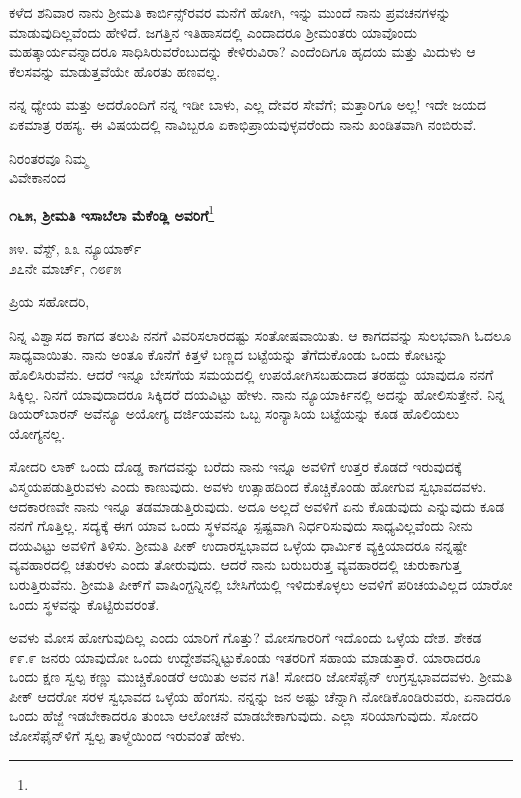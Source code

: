ಕಳೆದ ಶನಿವಾರ ನಾನು ಶ‍್ರೀಮತಿ ಕಾರ್ಬಿನ್ಸ್‌ರವರ ಮನೆಗೆ ಹೋಗಿ, ಇನ್ನು ಮುಂದೆ ನಾನು ಪ್ರವಚನಗಳನ್ನು ಮಾಡುವುದಿಲ್ಲವೆಂದು ಹೇಳಿದೆ. ಜಗತ್ತಿನ ಇತಿಹಾಸದಲ್ಲಿ ಎಂದಾದರೂ ಶ‍್ರೀಮಂತರು ಯಾವೊಂದು ಮಹತ್ಕಾರ್ಯವನ್ನಾದರೂ ಸಾಧಿಸಿರುವರೆಂಬುದನ್ನು ಕೇಳಿರುವಿರಾ? ಎಂದೆಂದಿಗೂ ಹೃದಯ ಮತ್ತು ಮಿದುಳು ಆ ಕೆಲಸವನ್ನು ಮಾಡುತ್ತವೆಯೇ ಹೊರತು ಹಣವಲ್ಲ.

ನನ್ನ ಧ್ಯೇಯ ಮತ್ತು ಅದರೊಂದಿಗೆ ನನ್ನ ಇಡೀ ಬಾಳು, ಎಲ್ಲ ದೇವರ ಸೇವೆಗೆ; ಮತ್ತಾರಿಗೂ ಅಲ್ಲ! ಇದೇ ಜಯದ ಏಕಮಾತ್ರ ರಹಸ್ಯ. ಈ ವಿಷಯದಲ್ಲಿ ನಾವಿಬ್ಬರೂ ಏಕಾಭಿಪ್ರಾಯವುಳ್ಳವರೆಂದು ನಾನು ಖಂಡಿತವಾಗಿ ನಂಬಿರುವೆ.

{\flushright
ನಿರಂತರವೂ ನಿಮ್ಮ\\ವಿವೇಕಾನಂದ\par}

\begin{center}
\textbf{೧೬೫, ಶ‍್ರೀಮತಿ ಇಸಾಬೆಲಾ ಮೆಕೆಂಡ್ಲಿ ಅವರಿಗೆ}\footnote{}
\end{center}

\begin{flushright}
೫೪. ವೆಸ್ಟ್, ೩೩ ನ್ಯೂಯಾರ್ಕ್\\೨೭ನೇ ಮಾರ್ಚ್, ೧೮೯೫
\end{flushright}

\noindent
ಪ್ರಿಯ ಸಹೋದರಿ,

ನಿನ್ನ ವಿಶ್ವಾಸದ ಕಾಗದ ತಲುಪಿ ನನಗೆ ವಿವರಿಸಲಾರದಷ್ಟು ಸಂತೋಷವಾಯಿತು. ಆ ಕಾಗದವನ್ನು ಸುಲಭವಾಗಿ ಓದಲೂ ಸಾಧ್ಯವಾಯಿತು. ನಾನು ಅಂತೂ ಕೊನೆಗೆ ಕಿತ್ತಳೆ ಬಣ್ಣದ ಬಟ್ಟೆಯನ್ನು ತೆಗೆದುಕೊಂಡು ಒಂದು ಕೋಟನ್ನು ಹೊಲಿಸಿರುವೆನು. ಆದರೆ ಇನ್ನೂ ಬೇಸಗೆಯ ಸಮಯದಲ್ಲಿ ಉಪಯೋಗಿಸಬಹುದಾದ ತರಹದ್ದು ಯಾವುದೂ ನನಗೆ ಸಿಕ್ಕಿಲ್ಲ. ನಿನಗೆ ಯಾವುದಾದರೂ ಸಿಕ್ಕಿದರೆ ದಯವಿಟ್ಟು ಹೇಳು. ನಾನು ನ್ಯೂಯಾರ್ಕಿನಲ್ಲಿ ಅದನ್ನು ಹೋಲಿಸುತ್ತೇನೆ. ನಿನ್ನ ಡಿಯರ್‌ಬಾರನ್ ಅವೆನ್ಯೂ ಅಯೋಗ್ಯ ದರ್ಜಿಯವನು ಒಬ್ಬ ಸಂನ್ಯಾಸಿಯ ಬಟ್ಟೆಯನ್ನು ಕೂಡ ಹೊಲಿಯಲು ಯೋಗ್ಯನಲ್ಲ.

ಸೋದರಿ ಲಾಕ್ ಒಂದು ದೊಡ್ಡ ಕಾಗದವನ್ನು ಬರೆದು ನಾನು ಇನ್ನೂ ಅವಳಿಗೆ ಉತ್ತರ ಕೊಡದೆ ಇರುವುದಕ್ಕೆ ವಿಸ್ಮಯಪಡುತ್ತಿರುವಳು ಎಂದು ಕಾಣುವುದು. ಅವಳು ಉತ್ಸಾಹದಿಂದ ಕೊಚ್ಚಿಕೊಂಡು ಹೋಗುವ ಸ್ವಭಾವದವಳು. ಆದಕಾರಣವೇ ನಾನು ಇನ್ನೂ ತಡಮಾಡುತ್ತಿರುವುದು. ಅದೂ ಅಲ್ಲದೆ ಅವಳಿಗೆ ಏನು ಕೊಡುವುದು ಎನ್ನುವುದು ಕೂಡ ನನಗೆ ಗೊತ್ತಿಲ್ಲ. ಸದ್ಯಕ್ಕೆ ಈಗ ಯಾವ ಒಂದು ಸ್ಥಳವನ್ನೂ ಸ್ಪಷ್ಟವಾಗಿ ನಿರ್ಧರಿಸುವುದು ಸಾಧ್ಯವಿಲ್ಲವೆಂದು ನೀನು ದಯವಿಟ್ಟು ಅವಳಿಗೆ ತಿಳಿಸು. ಶ‍್ರೀಮತಿ ಪೀಕ್ ಉದಾರಸ್ವಭಾವದ ಒಳ್ಳೆಯ ಧಾರ್ಮಿಕ ವ್ಯಕ್ತಿಯಾದರೂ ನನ್ನಷ್ಟೇ ವ್ಯವಹಾರದಲ್ಲಿ ಚತುರಳು ಎಂದು ತೋರುವುದು. ಆದರೆ ನಾನು ಬರುಬರುತ್ತ ವ್ಯವಹಾರದಲ್ಲಿ ಚುರುಕಾಗುತ್ತ ಬರುತ್ತಿರುವೆನು. ಶ‍್ರೀಮತಿ ಪೀಕ್‌ಗೆ ವಾಷಿಂಗ್ಟನ್ನಿನಲ್ಲಿ ಬೇಸಿಗೆಯಲ್ಲಿ ಇಳಿದುಕೊಳ್ಳಲು ಅವಳಿಗೆ ಪರಿಚಯವಿಲ್ಲದ ಯಾರೋ ಒಂದು ಸ್ಥಳವನ್ನು ಕೊಟ್ಟಿರುವರಂತೆ.

ಅವಳು ಮೋಸ ಹೋಗುವುದಿಲ್ಲ ಎಂದು ಯಾರಿಗೆ ಗೊತ್ತು? ಮೋಸಗಾರರಿಗೆ ಇದೊಂದು ಒಳ್ಳೆಯ ದೇಶ. ಶೇಕಡ ೯೯.೯ ಜನರು ಯಾವುದೋ ಒಂದು ಉದ್ದೇಶವನ್ನಿಟ್ಟುಕೊಂಡು ಇತರರಿಗೆ ಸಹಾಯ ಮಾಡುತ್ತಾರೆ. ಯಾರಾದರೂ ಒಂದು ಕ್ಷಣ ಸ್ವಲ್ಪ ಕಣ್ಣು ಮುಚ್ಚಿಕೊಂಡರೆ ಆಯಿತು ಅವನ ಗತಿ! ಸೋದರಿ ಜೋಸೆಫೈನ್ ಉಗ್ರಸ್ವಭಾವದವಳು. ಶ‍್ರೀಮತಿ ಪೀಕ್ ಆದರೋ ಸರಳ ಸ್ವಭಾವದ ಒಳ್ಳೆಯ ಹೆಂಗಸು. ನನ್ನನ್ನು ಜನ ಅಷ್ಟು ಚೆನ್ನಾಗಿ ನೋಡಿಕೊಂಡಿರುವರು, ಏನಾದರೂ ಒಂದು ಹೆಜ್ಜೆ ಇಡಬೇಕಾದರೂ ತುಂಬಾ ಆಲೋಚನೆ ಮಾಡಬೇಕಾಗುವುದು. ಎಲ್ಲಾ ಸರಿಯಾಗುವುದು. ಸೋದರಿ ಜೋಸೆಫೈನ್‌ಳಿಗೆ ಸ್ವಲ್ಪ ತಾಳ್ಮೆಯಿಂದ ಇರುವಂತೆ ಹೇಳು.

